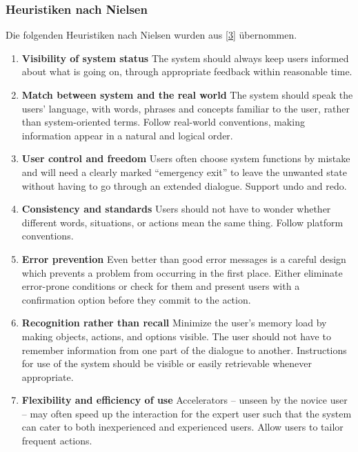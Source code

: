 \documentclass[
  12pt,
  ngerman,
  a4paper,
]{article}
\begin{document}
\hypertarget{sec:heuristiken-nielsen}{%
\subsubsection{Heuristiken nach Nielsen}\label{sec:heuristiken-nielsen}}

Die folgenden Heuristiken nach Nielsen wurden aus
{[}\protect\hyperlink{ref-heur:nielsen}{3}{]} übernommen.

\begin{enumerate}
\def\labelenumi{\arabic{enumi}.}
\item
  \textbf{Visibility of system status} The system should always keep
  users informed about what is going on, through appropriate feedback
  within reasonable time.
\item
  \textbf{Match between system and the real world} The system should
  speak the users' language, with words, phrases and concepts familiar
  to the user, rather than system-oriented terms. Follow real-world
  conventions, making information appear in a natural and logical order.
\item
  \textbf{User control and freedom} Users often choose system functions
  by mistake and will need a clearly marked ``emergency exit'' to leave
  the unwanted state without having to go through an extended dialogue.
  Support undo and redo.
\item
  \textbf{Consistency and standards} Users should not have to wonder
  whether different words, situations, or actions mean the same thing.
  Follow platform conventions.
\item
  \textbf{Error prevention} Even better than good error messages is a
  careful design which prevents a problem from occurring in the first
  place. Either eliminate error-prone conditions or check for them and
  present users with a confirmation option before they commit to the
  action.
\item
  \textbf{Recognition rather than recall} Minimize the user's memory
  load by making objects, actions, and options visible. The user should
  not have to remember information from one part of the dialogue to
  another. Instructions for use of the system should be visible or
  easily retrievable whenever appropriate.
\item
  \textbf{Flexibility and efficiency of use} Accelerators -- unseen by
  the novice user -- may often speed up the interaction for the expert
  user such that the system can cater to both inexperienced and
  experienced users. Allow users to tailor frequent actions.

\end{enumerate}
\end{document}

